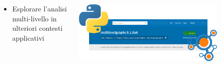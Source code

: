\begin{minipage}[t]{\textwidth}
    \begin{columns}
        \begin{column}{0.5\textwidth}
        \begin{itemize}
            \item Esplorare l'analisi multi-livello in ulteriori contesti applicativi
        \end{itemize}
        \end{column}
    \begin{column}{0.5\textwidth}
        \centering
        \includegraphics[width=0.8\textwidth]{immagini/pypi}
    \end{column}
\end{columns}
\end{minipage}